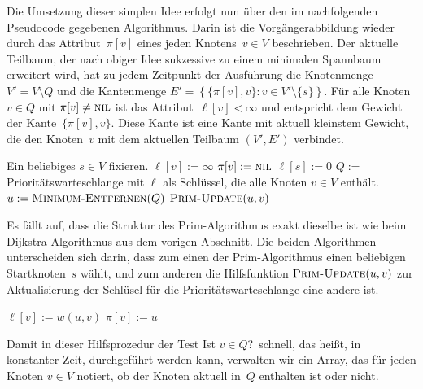 \begin{bem}
Die Umsetzung dieser simplen Idee erfolgt nun über den im nachfolgenden Pseudocode gegebenen Algorithmus.
Darin ist die Vorgängerabbildung wieder durch das Attribut~$\pi[v]$ eines jeden Knotens~$v \in V$ beschrieben.
Der aktuelle Teilbaum, der nach obiger Idee sukzessive zu einem minimalen Spannbaum erweitert wird, hat zu jedem Zeitpunkt der Ausführung die Knotenmenge $V' = V \setminus Q$ und die Kantenmenge $E' = \left\{\{\pi[v],v\} : v \in V' \setminus \{s\}\right\}$.
Für alle Knoten~$v \in Q$ mit $\pi[v] \neq \mathop{\text{\textsc{nil}}}$ ist das Attribut~$\ell[v] < \infty$ und entspricht dem Gewicht der Kante~$\{\pi[v],v\}$.
Diese Kante ist eine Kante mit aktuell kleinstem Gewicht, die den Knoten~$v$ mit dem aktuellen Teilbaum $(V',E')$ verbindet.

\begin{algorithm}[H]
\caption{$\cc{Prim}()$}
\begin{algorithmic}[1]
 \STATE Ein beliebiges $s \in V$ fixieren.
 \STATE{}
  \STATE $\ell[v] := \infty$
  \STATE $\pi[v] := \mathop{\text{\textsc{nil}}}$
 \ENDFOR
 \STATE $\ell[s] := 0$
 \STATE $Q := $ Prioritätswarteschlange mit $\ell$ als Schlüssel, die alle Knoten $v \in V$ enthält.
 \STATE{}
  \STATE $u := \mathop{\text{\textsc{Minimum-Entfernen}}}(Q)$ 
   \STATE $\cc{Prim-Update}(u,v)$
  \ENDFOR
 \ENDWHILE
\end{algorithmic}
\end{algorithm}

Es fällt auf, dass die Struktur des Prim-Algorithmus exakt dieselbe ist wie beim Dijkstra-Algorithmus aus dem vorigen Abschnitt.
Die beiden Algorithmen unterscheiden sich darin, dass zum einen der Prim-Algorithmus einen beliebigen Startknoten~$s$ wählt, und zum anderen die Hilfsfunktion $\cc{Prim-Update}(u,v)$ zur Aktualisierung der Schlüsel für die Prioritätswarteschlange eine andere ist.

\begin{algorithm}[H]
	\caption{$\cc{Prim-Update}(u,v)$}
	\begin{algorithmic}[1]
		\STATE $\ell[v]:=w(u,v)$
		\STATE $\pi[v] := u$
		\ENDIF
	\end{algorithmic}
\end{algorithm}

Damit in dieser Hilfsprozedur der Test \glqq Ist $v \in Q$?\grqq\ schnell, das heißt, in konstanter Zeit, durchgeführt werden kann, verwalten wir ein Array, das für jeden Knoten $v \in V$ notiert, ob der Knoten aktuell in~$Q$ enthalten ist oder nicht. 
\end{bem}

